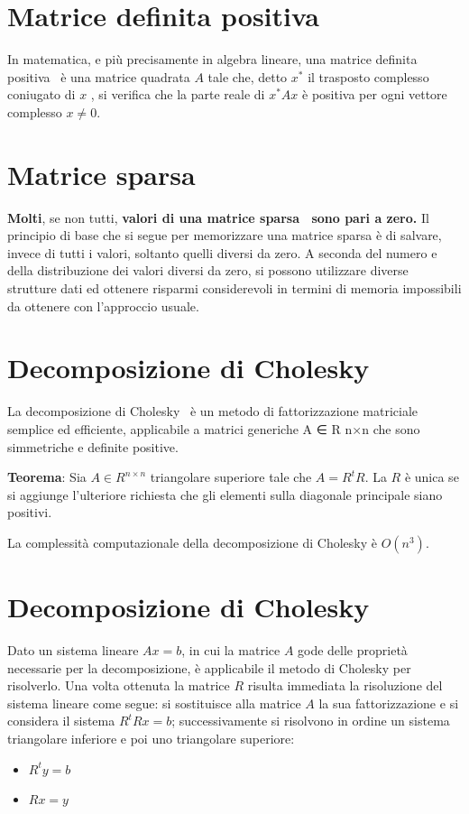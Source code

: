 \documentclass[a4paper,12pt,titlepage,oneside]{book}
\begin{document}
\section{Matrice definita positiva}
In matematica, e più precisamente in algebra lineare, una matrice definita positiva~\cite{matpos} è una matrice quadrata $A$ tale che, detto  $x^*$  il trasposto complesso coniugato di $x$ , si verifica che la parte reale di $x^*Ax$ è positiva per ogni vettore complesso \begin{math} x \neq 0\end{math}.


\section{Matrice sparsa}
\textbf{Molti}, se non tutti, \textbf{valori di una matrice sparsa~\cite{matspa} sono pari a zero.} 
Il principio di base che si segue per memorizzare una matrice sparsa è di salvare, invece di tutti i valori, soltanto quelli diversi da zero. A seconda del numero e della distribuzione dei valori diversi da zero, si possono utilizzare diverse strutture dati ed ottenere risparmi considerevoli in termini di memoria impossibili da ottenere con l'approccio usuale.


\section{Decomposizione di Cholesky}
La decomposizione di Cholesky~\cite{disp} è un metodo di fattorizzazione matriciale semplice ed efficiente, applicabile a matrici generiche A ∈ R n×n che sono simmetriche e definite positive.

\textbf{Teorema}: Sia \begin{math}A \in R^{n \times n} \end{math} triangolare superiore tale che \begin{math} A = R^{t}R \end{math}.
La $R$ è unica se si aggiunge l’ulteriore richiesta che gli elementi sulla diagonale principale siano positivi.

La complessità computazionale della decomposizione di Cholesky è \begin{math} O(n^3) \end{math}.


\section{Decomposizione di Cholesky}
Dato un sistema lineare $Ax = b$, in cui la matrice $A$ gode delle proprietà necessarie per la decomposizione, è applicabile il metodo di Cholesky per risolverlo. Una volta ottenuta la matrice $R$ risulta immediata la risoluzione del sistema lineare come segue: si sostituisce alla matrice $A$ la sua fattorizzazione e si considera il sistema $R^tRx = b$; successivamente si risolvono in ordine un sistema triangolare inferiore e poi uno triangolare superiore:
\begin{itemize}
  \item $R^t y = b$
  \item $Rx = y$
\end{itemize}
\end{document}
